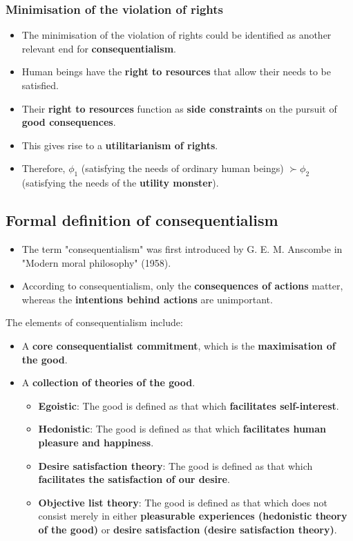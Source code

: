 \documentclass[11pt]{article}
\begin{document}
\subsubsection{Minimisation of the violation of rights}
\label{sec:orgea38904}
\begin{itemize}
\item The minimisation of the violation of rights could be identified as another relevant end for \textbf{consequentialism}.
\item Human beings have the \textbf{right to resources} that allow their needs to be satisfied.
\item Their \textbf{right to resources} function as \textbf{side constraints} on the pursuit of \textbf{good consequences}.
\item This gives rise to a \textbf{utilitarianism of rights}.
\item Therefore, \(\phi_1\) (satisfying the needs of ordinary human beings) \(\succ \phi_2\) (satisfying the needs of the \textbf{utility monster}).
\end{itemize}
\subsection{Formal definition of consequentialism}
\label{sec:org9654f07}
\begin{itemize}
\item The term "consequentialism" was first introduced by G. E. M. Anscombe in "Modern moral philosophy" (1958).
\item According to consequentialism, only the \textbf{consequences of actions} matter, whereas the \textbf{intentions behind actions} are unimportant.
\end{itemize}

The elements of consequentialism include:
\begin{itemize}
\item A \textbf{core consequentialist commitment}, which is the \textbf{maximisation of the good}.
\item A \textbf{collection of theories of the good}.
\begin{itemize}
\item \textbf{Egoistic}: The good is defined as that which \textbf{facilitates self-interest}.
\item \textbf{Hedonistic}: The good is defined as that which \textbf{facilitates human pleasure and happiness}.
\item \textbf{Desire satisfaction theory}: The good is defined as that which \textbf{facilitates the satisfaction of our desire}.
\item \textbf{Objective list theory}: The good is defined as that which does not consist merely in either \textbf{pleasurable experiences (hedonistic theory of the good)} or \textbf{desire satisfaction (desire satisfaction theory)}.
\end{itemize}
\end{itemize}
\end{document}
